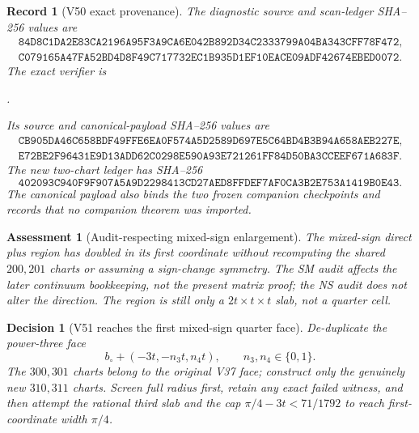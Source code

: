 \documentclass[11pt,oneside]{article}
\newtheorem{assessment}[theorem]{Assessment}
\newtheorem{record}[theorem]{Record}
\newtheorem{decision}[theorem]{Decision}
\theoremstyle{definition}
\theoremstyle{remark}
\begin{document}
\begin{record}[V50 exact provenance]
\label{rec:newv50-provenance}
The diagnostic source and scan-ledger SHA--256 values are
\[
\begin{gathered}
\texttt{84D8C1DA2E83CA2196A95F3A9CA6E042B892D34C2333799A04BA343CFF78F472},\\
\texttt{C079165A47FA52BD4D8F49C717732EC1B935D1EF10EACE09ADF42674EBED0072}.
\end{gathered}                                         \tag{50.11}
\]
The exact verifier is
\begin{center}
\footnotesize
{}.
\end{center}
Its source and canonical-payload SHA--256 values are
\[
\begin{gathered}
\texttt{CB905DA46C658BDF49FFE6EA0F574A5D2589D697E5C64BD4B3B94A658AEB227E},\\
\texttt{E72BE2F96431E9D13ADD62C0298E590A93E721261FF84D50BA3CCEEF671A683F}.
\end{gathered}                                         \tag{50.12}
\]
The new two-chart ledger has SHA--256
\[
\texttt{402093C940F9F907A5A9D2298413CD27AED8FFDEF7AF0CA3B2E753A1419B0E43}.
                                                               \tag{50.13}
\]
The canonical payload also binds the two frozen companion
checkpoints and records that no companion theorem was imported.
\end{record}

\begin{assessment}[Audit-respecting mixed-sign enlargement]
\label{ass:newv50}
The mixed-sign direct plus region has doubled in its first
coordinate without recomputing the shared \(200,201\) charts or
assuming a sign-change symmetry.  The SM audit affects the later
continuum bookkeeping, not the present matrix proof; the NS audit
does not alter the direction.  The region is still only a
\(2t\times t\times t\) slab, not a quarter cell.
\end{assessment}

\begin{decision}[V51 reaches the first mixed-sign quarter face]
\label{dec:newv50-next}
De-duplicate the power-three face
\[
 b_\circ+(-3t,-n_3t,n_4t),\qquad n_3,n_4\in\{0,1\}.   \tag{50.14}
\]
The \(300,301\) charts belong to the original V37 face; construct
only the genuinely new \(310,311\) charts.  Screen full radius
first, retain any exact failed witness, and then attempt the
rational third slab and the cap
\(\pi/4-3t<71/1792\) to reach first-coordinate width \(\pi/4\).
\end{decision}
\end{document}
